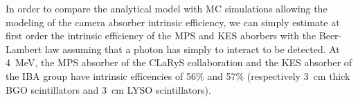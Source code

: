 \documentclass[a4paper,english,12pt]{article}
\newcommand{\mc}[3]{\multicolumn{#1}{#2}{#3}}
\newcommand{\answ}[1]{\todo[linecolor=blue,backgroundcolor=blue!25,bordercolor=blue]{#1}}
\begin{document}



In order to compare the analytical model with MC simulations allowing the modeling of the camera absorber intrinsic efficiency, we can simply estimate at first order the intrinsic efficiency of the MPS and KES aborbers with the Beer-Lambert law assuming that a photon has simply to interact to be detected. At 4~MeV, the MPS absorber of the CLaRyS collaboration and the KES absorber of the IBA group have intrinsic efficencies of 56\% and 57\% (respectively 3~cm thick BGO scintillators and 3~cm LYSO scintillators).


\end{document}
